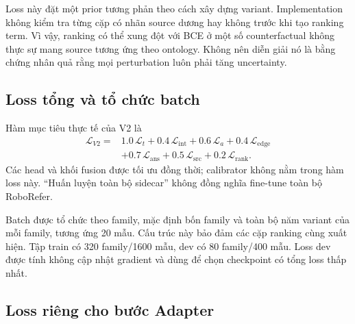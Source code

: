 Loss này đặt một prior tương phản theo cách xây dựng variant.
Implementation không kiểm tra từng cặp có nhãn source dương
hay không trước khi tạo ranking term. Vì vậy, ranking có thể
xung đột với BCE ở một số counterfactual không thực sự mang
source tương ứng theo ontology. Không nên diễn giải nó là
bằng chứng nhân quả rằng mọi perturbation luôn phải tăng
uncertainty.

\subsection{Loss tổng và tổ chức batch}

Hàm mục tiêu thực tế của V2 là
\begin{equation}
\begin{split}
    \mathcal{L}_{V2}={}&
    1.0\,\mathcal{L}_t+
    0.4\,\mathcal{L}_{\mathrm{int}}+
    0.6\,\mathcal{L}_a+
    0.4\,\mathcal{L}_{\mathrm{edge}}\\
    &+0.7\,\mathcal{L}_{\mathrm{ans}}+
    0.5\,\mathcal{L}_{\mathrm{src}}+
    0.2\,\mathcal{L}_{\mathrm{rank}}.
    \label{eq:method-total-loss}
\end{split}
\end{equation}
Các head và khối fusion được tối ưu đồng thời; calibrator
không nằm trong hàm loss này. “Huấn luyện toàn bộ sidecar”
không đồng nghĩa fine-tune toàn bộ RoboRefer.

Batch được tổ chức theo family, mặc định bốn family và
toàn bộ năm variant của mỗi family, tương ứng 20 mẫu.
Cấu trúc này bảo đảm các cặp ranking cùng xuất hiện.
Tập train có 320 family/1600 mẫu, dev có 80 family/400 mẫu.
Loss dev được tính không cập nhật gradient và dùng để
chọn checkpoint có tổng loss thấp nhất.

\subsection{Loss riêng cho bước Adapter}

